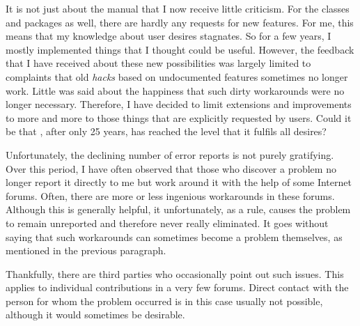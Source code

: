 
It is not just about the manual that I now receive little criticism. For the
classes and packages as well, there are hardly any requests for new features.
For me, this means that my knowledge about user desires stagnates. So for a
few years, I mostly implemented things that I thought could be useful.
However, the feedback that I have received about these new possibilities was
largely limited to complaints that old \emph{hacks} based on undocumented
\KOMAScript{} features sometimes no longer work. Little was said about the
happiness that such dirty workarounds were no longer necessary. Therefore, I
have decided to limit extensions and improvements to \KOMAScript{} more and
more to those things that are explicitly requested by users. Could it be that
\KOMAScript{}, after only 25 years, has reached the level that it fulfils all
desires?

Unfortunately, the declining number of error reports is not purely gratifying.
Over this period, I have often observed that those who discover a problem no
longer report it directly to me but work around it with the help of some
Internet forums. Often, there are more or less ingenious workarounds in these
forums. Although this is generally helpful, it unfortunately, as a rule,
causes the problem to remain unreported and therefore never really eliminated.
It goes without saying that such workarounds can sometimes become a problem
themselves, as mentioned in the previous paragraph.

Thankfully, there are third parties who occasionally point out such issues.
This applies to individual contributions in a very few forums. Direct contact
with the person for whom the problem occurred is in this case usually not
possible, although it would sometimes be desirable.

